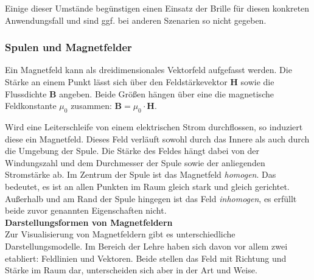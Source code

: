 Einige dieser Umstände begünstigen einen Einsatz der Brille für diesen konkreten Anwendungsfall und sind ggf. bei anderen Szenarien so nicht gegeben.\\

\subsubsection{Spulen und Magnetfelder}
\label{sec-2-3-2}
Ein Magnetfeld kann als dreidimensionales Vektorfeld aufgefasst werden. Die Stärke an einem Punkt lässt sich über den Feldstärkevektor $\boldsymbol{H}$ sowie die Flussdichte $\boldsymbol{B}$ angeben. Beide Größen hängen über eine die magnetische Feldkonstante $\mu_{0}$ zusammen: $\boldsymbol{B} = \mu_{0} \cdot \boldsymbol{H}$.
\par
\noindent\hspace*{5mm}
Wird eine Leiterschleife von einem elektrischen Strom durchflossen, so induziert diese ein Magnetfeld. Dieses Feld verläuft sowohl durch das Innere als auch durch die Umgebung der Spule. Die Stärke des Feldes hängt dabei von der Windungszahl und dem Durchmesser der Spule sowie der anliegenden Stromstärke ab.
Im Zentrum der Spule ist das Magnetfeld \textit{homogen}. Das bedeutet, es ist an allen Punkten im Raum gleich stark und gleich gerichtet. Außerhalb und am Rand der Spule hingegen ist das Feld \textit{inhomogen}, es erfüllt beide zuvor genannten Eigenschaften nicht.\\

\textbf{Darstellungsformen von Magnetfeldern}\\
Zur Visualisierung von Magnetfeldern gibt es unterschiedliche Darstellungsmodelle. Im Bereich der Lehre haben sich davon vor allem zwei etabliert: Feldlinien und Vektoren. Beide stellen das Feld mit Richtung und Stärke im Raum dar, unterscheiden sich aber in der Art und Weise.\\ %

